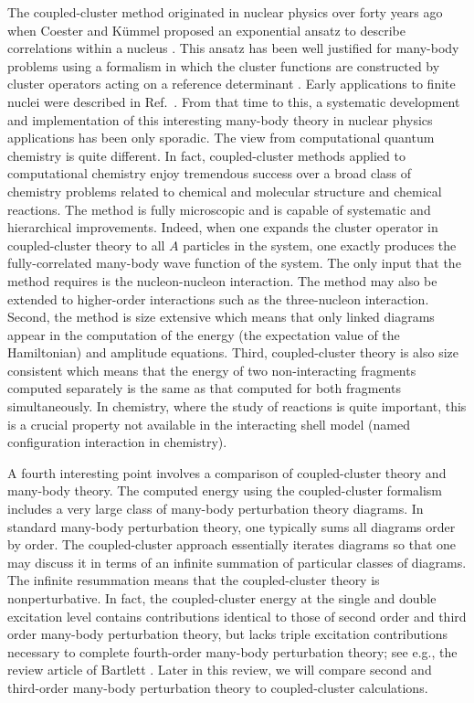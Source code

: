 \documentclass[twoside,12pt]{article}
\begin{document}
The coupled-cluster method originated in nuclear physics over
forty years ago when Coester and K\"ummel proposed an exponential ansatz
to describe correlations within a nucleus
\cite{coester58,coester60}. This ansatz has been well justified
for many-body problems using a formalism in which the
cluster functions are constructed by cluster operators acting on
a reference determinant \cite{harris92}. Early applications
to finite nuclei were described in Ref.~\cite{klz78}. From that
time to this, a systematic development and implementation
of this interesting many-body theory in nuclear
physics applications has been only sporadic. The view from
computational quantum chemistry is quite different.
In fact, coupled-cluster methods applied to computational chemistry
enjoy tremendous success
\cite{bartlett81,comp_chem_rev00,piotr1,helgaker,arponen97}
over a broad class of
chemistry problems related to chemical and
molecular structure and chemical reactions.
The method is fully
microscopic and is capable of systematic and hierarchical improvements.
Indeed, when one expands the cluster operator in coupled-cluster theory
to all $A$ particles in the system, one exactly produces the fully-correlated
many-body wave function of the system. The only input that the method
requires is the nucleon-nucleon interaction.
The method may also be extended
to higher-order interactions such as the three-nucleon interaction.
Second, the method is size extensive which means that only linked
diagrams appear in the computation of the
energy (the expectation value of the Hamiltonian) and amplitude equations.
Third, coupled-cluster theory is also size
consistent which means that the energy of two non-interacting fragments
computed separately is the same as that computed for both fragments
simultaneously. In chemistry, where the study of reactions
is quite important, this is a crucial property not available
in the interacting shell model (named configuration interaction in
chemistry).

A fourth interesting point involves a comparison of 
coupled-cluster theory and many-body theory. 
The computed energy using the coupled-cluster formalism includes 
a very large class of many-body perturbation theory diagrams.
In standard many-body perturbation theory, one typically sums
all diagrams order by order. The coupled-cluster approach essentially
iterates diagrams so that one may discuss it in terms of an infinite
summation of particular classes of diagrams. The infinite resummation
means that the coupled-cluster theory is nonperturbative. In fact, the 
coupled-cluster energy at the single and double excitation level
contains contributions identical to
those of second order and third order many-body perturbation theory, but
lacks triple excitation contributions necessary to complete fourth-order
many-body perturbation theory; see e.g., the review article of
Bartlett \cite{bartlett81}. Later in this review, we will compare 
second and third-order many-body perturbation theory to coupled-cluster
calculations. 
\end{document}
